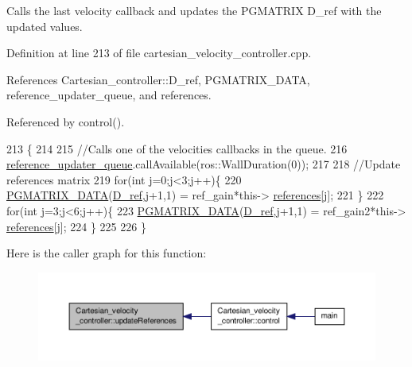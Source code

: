 Calls the last velocity callback and updates the P\-G\-M\-A\-T\-R\-I\-X D\-\_\-ref with the updated values. 



Definition at line 213 of file cartesian\-\_\-velocity\-\_\-controller.\-cpp.



References Cartesian\-\_\-controller\-::\-D\-\_\-ref, P\-G\-M\-A\-T\-R\-I\-X\-\_\-\-D\-A\-T\-A, reference\-\_\-updater\-\_\-queue, and references.



Referenced by control().


\begin{DoxyCode}
213                                                                                             \{
214 
215         \textcolor{comment}{//Calls one of the velocities callbacks in the queue.}
216         \hyperlink{classCartesian__velocity__controller_ad2804cf83a42305d18572abdbbfd1c3f}{reference\_updater\_queue}.callAvailable(ros::WallDuration(0));
217 
218         \textcolor{comment}{//Update references matrix}
219         \textcolor{keywordflow}{for}(\textcolor{keywordtype}{int} j=0;j<3;j++)\{
220                 \hyperlink{gmatrix_8h_a7333180c47234295df2bd7b09ac00da8}{PGMATRIX\_DATA}(\hyperlink{classCartesian__controller_abb248cb3215a574fe8e1bb8fb0b8626d}{D\_ref},j+1,1) = ref\_gain*this->
      \hyperlink{classCartesian__velocity__controller_afc3792f1f6dd0025417d752a89e519e1}{references}[j];
221         \}
222         \textcolor{keywordflow}{for}(\textcolor{keywordtype}{int} j=3;j<6;j++)\{
223                 \hyperlink{gmatrix_8h_a7333180c47234295df2bd7b09ac00da8}{PGMATRIX\_DATA}(\hyperlink{classCartesian__controller_abb248cb3215a574fe8e1bb8fb0b8626d}{D\_ref},j+1,1) = ref\_gain2*this->
      \hyperlink{classCartesian__velocity__controller_afc3792f1f6dd0025417d752a89e519e1}{references}[j];
224         \}
225 
226 \}
\end{DoxyCode}


Here is the caller graph for this function\-:\nopagebreak
\begin{figure}[H]
\begin{center}
\leavevmode
\includegraphics[width=350pt]{classCartesian__velocity__controller_a9b2c7f25b3fc2882f7e4590ee97e0978_icgraph}
\end{center}
\end{figure}




